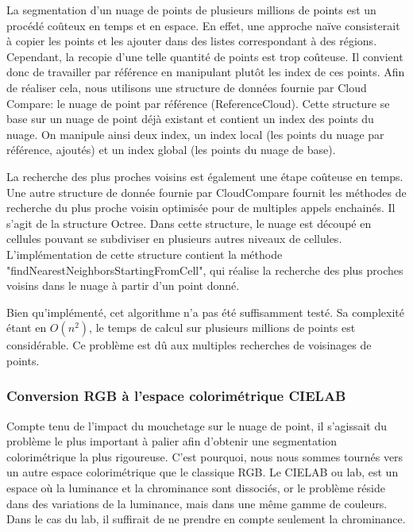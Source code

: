 \documentclass[12pt,titlepage,french]{article}
\begin{document}
La segmentation d'un nuage de points de plusieurs millions de points est un procédé coûteux en temps et en espace. En effet, une approche naïve consisterait à copier les points et les ajouter dans des listes correspondant à des régions. Cependant, la recopie d'une telle quantité de points est trop coûteuse. Il convient donc de travailler par référence en manipulant plutôt les index de ces points.
Afin de réaliser cela, nous utilisons une structure de données fournie par Cloud Compare: le nuage de point par référence (ReferenceCloud). Cette structure se base sur un nuage de point déjà existant et contient un index des points du nuage. On manipule ainsi deux index, un index local (les points du nuage par référence, ajoutés) et un index global (les points du nuage de base). \newline

La recherche des plus proches voisins est également une étape coûteuse en temps. Une autre structure de donnée fournie par CloudCompare fournit les méthodes de recherche du plus proche voisin optimisée pour de multiples appels enchainés. Il s'agit de la structure Octree. Dans cette structure, le nuage est découpé en cellules pouvant se subdiviser en plusieurs autres niveaux de cellules. L'implémentation de cette structure contient la méthode "findNearestNeighborsStartingFromCell", qui réalise la recherche des plus proches voisins dans le nuage à partir d'un point donné. \newline

Bien qu'implémenté, cet algorithme n'a pas été suffisamment testé. Sa complexité étant en $O(n^{2})$, le temps de calcul sur plusieurs millions de points est considérable. Ce problème est dû aux multiples recherches de voisinages de points.

\subsubsection{Conversion RGB à l'espace colorimétrique CIELAB}

Compte tenu de l'impact du mouchetage sur le nuage de point, il s'agissait du problème le plus important à palier afin d'obtenir une segmentation colorimétrique la plus rigoureuse.
C'est pourquoi, nous nous sommes tournés vers un autre espace colorimétrique que le classique RGB.
Le CIELAB ou lab, est un espace où la luminance et la chrominance sont dissociés, or le problème réside dans des variations de la luminance, mais dans une même gamme de couleurs.
Dans le cas du lab, il suffirait de ne prendre en compte seulement la chrominance.
\newline
\end{document}
